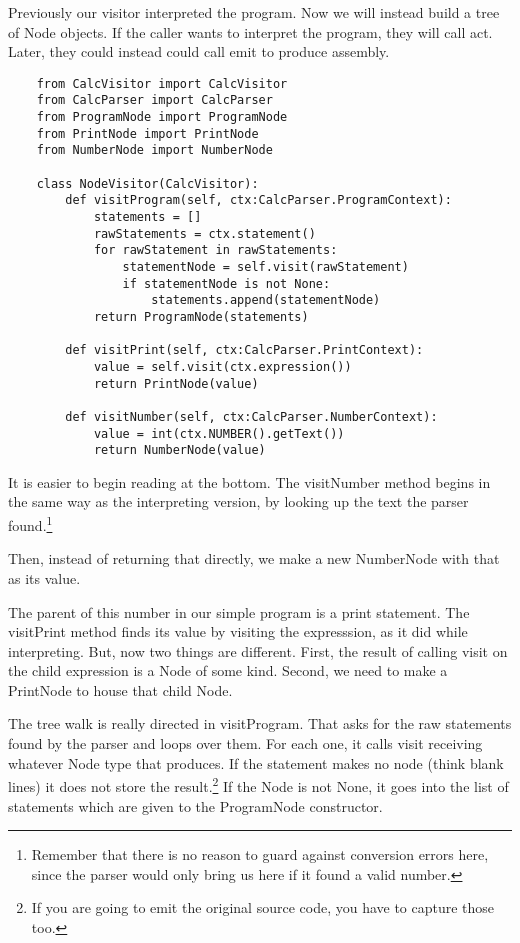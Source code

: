Previously our visitor interpreted the program. Now we will instead
build a tree of Node objects. If the caller wants to interpret the
program, they will call act. Later, they could instead could call emit
to produce assembly.

{\footnotesize
\begin{verbatim}
    from CalcVisitor import CalcVisitor
    from CalcParser import CalcParser
    from ProgramNode import ProgramNode
    from PrintNode import PrintNode
    from NumberNode import NumberNode

    class NodeVisitor(CalcVisitor):
        def visitProgram(self, ctx:CalcParser.ProgramContext):
            statements = []
            rawStatements = ctx.statement()
            for rawStatement in rawStatements:
                statementNode = self.visit(rawStatement)
                if statementNode is not None:
                    statements.append(statementNode)
            return ProgramNode(statements)

        def visitPrint(self, ctx:CalcParser.PrintContext):
            value = self.visit(ctx.expression())
            return PrintNode(value)

        def visitNumber(self, ctx:CalcParser.NumberContext):
            value = int(ctx.NUMBER().getText())
            return NumberNode(value)
\end{verbatim}
}

It is easier to begin reading at the bottom. The visitNumber method
begins in the same way as the interpreting version, by looking up
the text the parser found.\footnote{Remember that there is no reason
to guard against conversion errors here, since the parser would
only bring us here if it found a valid number.}

Then, instead of returning that directly, we make a new
NumberNode with that as its value.

The parent of this number in our simple program is a print statement.
The visitPrint method finds its value by visiting the expresssion, as
it did while interpreting. But, now two things are different. First,
the result of calling visit on the child expression is a Node of some
kind. Second, we need to make a PrintNode to house that child Node.

The tree walk is really directed in visitProgram. That asks for
the raw statements found by the parser and loops over them.
For each one, it calls visit receiving whatever Node type that
produces. If the statement makes no node (think blank lines)
it does not store the result.\footnote{If you are going to emit
the original source code, you have to capture those too.}
If the Node is not None, it goes into the list of statements
which are given to the ProgramNode constructor.

